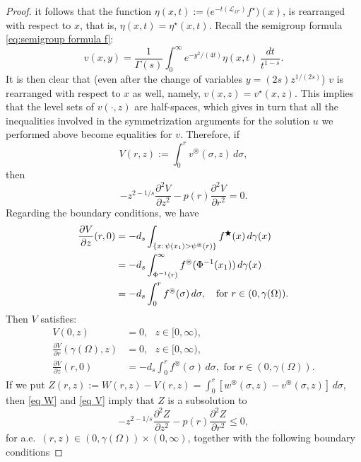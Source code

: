 \documentclass[a4paper,10pt,reqno]{amsart}
\numberwithin{equation}{section}
\begin{document}
\begin{proof}
it follows that the function
$\displaystyle\eta(x,t):=\big(e^{-t(\mathcal{L}_{\Omega^{\displaystyle\star}})}f^{\displaystyle\star}\big)(x)$,
is rearranged with respect to $x$, that is, $\eta(x,t)=\eta^{\displaystyle\star}(x,t)$. Recall the semigroup formula \eqref{eq:semigroup formula f}:
\[
v(x,y)=\frac{1}{\Gamma(s)}\int_{0}^{\infty}e^{-y^{2}/(4t)}
\eta(x,t)\,\frac{dt}{t^{1-s}}.
\]
It is then clear that (even after the change of variables $y=(2s)z^{1/(2s)}$)
$v$ is rearranged with respect to $x$ as well,
namely, $v(x,z)=v^{\displaystyle\star}(x,z)$. This implies that the level sets of
$v(\cdot,z)$ are half-spaces, which gives in turn that all the inequalities involved
in the symmetrization arguments for the solution $u$ we performed above
become equalities for $v$. Therefore, if
$$V(r,z):=\int_{0}^{r}v^{\circledast}(\sigma,z)\,d\sigma,$$
then
\begin{equation}
-z^{2-1/s}\frac{\partial^{2}V}{\partial z^{2}}-p(r)\frac{\partial^{2}%
V}{\partial r^{2}}=0. \label{eq V}
\end{equation}
Regarding the boundary conditions, we have
\begin{align*}
\frac{\partial V}{\partial z}(r,0)  &  =-d_s\int_{\{x:\,\psi(x_{1})>\psi^{\circledast}(r)\}}f^{\bigstar}(x)\, d\gamma(x)\\
&  =-d_s\int_{\Phi^{-1}(r)}^{\infty}f^{\circledast}(\Phi^{-1}(x_{1}))\, d\gamma(x)\\
&  =-d_s\int_{0}^{r}f^{\circledast}(\sigma)\,d\sigma,\quad\hbox{for}~r\in(0,\gamma(\Omega)).
\end{align*}
Then $V$ satisfies:%
\begin{align*}
V(0,z)  &  =0,\text{ \ \ } z\in[0,\infty), \\
\frac{\partial V}{\partial r}(\gamma(\Omega),z)  &  =0,\text{ \ \ }
z\in[0,\infty), \\
\frac{\partial V}{\partial z}(r,0)  &  =-d_s\int_{0}^{r}f^{\circledast}%
(\sigma)\,d\sigma,\text{ \ for }r\in(0,\gamma(\Omega)).
\end{align*}
If we put $\displaystyle Z(r,z):=W(r,z)-V(r,z)=\int_{0}^{r}[w^{\circledast}(\sigma,z)-v^{\circledast}(\sigma,z)]\,d\sigma$,
then \eqref{eq W} and \eqref{eq V} imply that $Z$ is a subsolution to
\begin{equation}
-z^{2-1/s}\frac{\partial^{2}Z}{\partial z^{2}}-p(r)\frac{\partial^{2}%
Z}{\partial r^{2}}\leq0,\label{subsolution}
\end{equation}
for a.e.~$(r,z)\in(0,\gamma(\Omega))\times(0,\infty)$,
together with the following boundary conditions

\end{proof}
\end{document}
